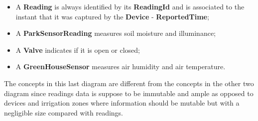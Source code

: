 \begin{itemize}
   \item A \textbf{Reading} is always identified by its \textbf{ReadingId} and is associated to the instant that it was captured by the \textbf{Device} - \textbf{ReportedTime};
   \item A \textbf{ParkSensorReading} measures soil moisture and illuminance;
   \item A \textbf{Valve} indicates if it is open or closed;
   \item A \textbf{GreenHouseSensor} measures air humidity and air temperature.
\end{itemize}

The concepts in this last diagram are different from the concepts in the other two diagram since readings data is suppose to be immutable and ample as opposed to devices and irrigation zones where information should be mutable but with a negligible size compared with readings.
